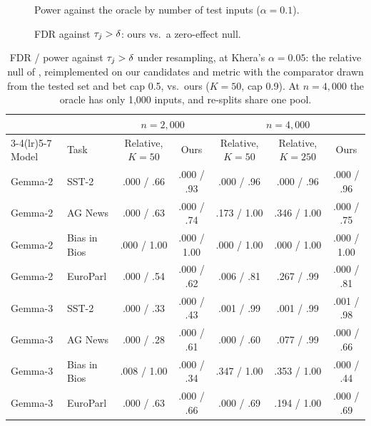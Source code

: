 \begin{figure}[t]
\centering
{}
\caption{Power against the oracle by number of test inputs ($\alpha = 0.1$).}
\label{fig:power}
\end{figure}

\begin{figure}[t]
\centering
\begin{minipage}[t]{0.49\textwidth}
\centering
{}
\caption{Effects of the 250 candidates per task relative to $\delta$.}
\label{fig:effects}
\end{minipage}\hfill
\begin{minipage}[t]{0.49\textwidth}
\centering
{}
\caption{FDR against $\tau_j > \delta$: ours vs.\ a zero-effect null.}
\label{fig:zeronull}
\end{minipage}
\end{figure}

\begin{table}[t]
\centering
\small
\setlength{\tabcolsep}{4pt}
\begin{tabular}{llccccc}
\toprule
 & & \multicolumn{2}{c}{$n = 2{,}000$} & \multicolumn{3}{c}{$n = 4{,}000$} \\
\cmidrule(lr){3-4}\cmidrule(lr){5-7}
Model & Task & Relative, $K{=}50$ & Ours & Relative, $K{=}50$ & Relative, $K{=}250$ & Ours \\
\midrule
Gemma-2 & SST-2 & .000 / .66 & .000 / .93 & .000 / .96 & .000 / .96 & .000 / .96 \\
Gemma-2 & AG News & .000 / .63 & .000 / .74 & .173 / 1.00 & .346 / 1.00 & .000 / .75 \\
Gemma-2 & Bias in Bios & .000 / 1.00 & .000 / 1.00 & .000 / 1.00 & .000 / 1.00 & .000 / 1.00 \\
Gemma-2 & EuroParl & .000 / .54 & .000 / .62 & .006 / .81 & .267 / .99 & .000 / .81 \\
Gemma-3 & SST-2 & .000 / .33 & .000 / .43 & .001 / .99 & .001 / .99 & .001 / .98 \\
Gemma-3 & AG News & .000 / .28 & .000 / .61 & .000 / .60 & .077 / .99 & .000 / .66 \\
Gemma-3 & Bias in Bios & .008 / 1.00 & .000 / .34 & .347 / 1.00 & .353 / 1.00 & .000 / .44 \\
Gemma-3 & EuroParl & .000 / .63 & .000 / .66 & .000 / .69 & .194 / 1.00 & .000 / .69 \\
\bottomrule
\end{tabular}
\caption{FDR / power against $\tau_j > \delta$ under resampling, at Khera's $\alpha = 0.05$: the relative null of
\citet{khera2026}, reimplemented on our candidates and metric with the comparator drawn from the tested set and
bet cap 0.5, vs.\ ours ($K = 50$, cap 0.9). At $n = 4{,}000$ the oracle has only 1,000 inputs, and re-splits share one pool.}
\label{tab:khera}
\end{table}

